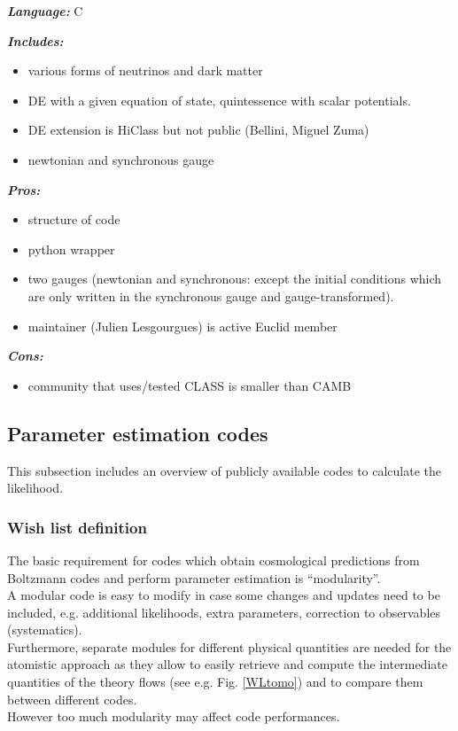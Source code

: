 {\it \bf  Language:} C

{\it \bf Includes:}
\begin{itemize}
 \item various forms of neutrinos and dark matter
 \item DE with a given equation of state, quintessence with scalar potentials.
 \item DE extension is HiClass but not public (Bellini, Miguel Zuma)
 \item newtonian and synchronous gauge
\end{itemize}

{\it \bf Pros: }
\begin{itemize}
 \item structure of code
 \item python wrapper
 \item two gauges (newtonian and synchronous: except the initial conditions which are only written in the synchronous gauge and gauge-transformed). 
 \item maintainer (Julien Lesgourgues) is active Euclid member
\end{itemize}

{\it \bf Cons: }
\begin{itemize}
 \item community that uses/tested CLASS is smaller than CAMB
\end{itemize}


\newpage
\subsection{Parameter estimation codes}
This subsection includes an overview of publicly available codes to calculate the likelihood.

\subsubsection{Wish list definition}

The basic requirement for codes which obtain cosmological predictions from Boltzmann codes and perform parameter estimation is ``modularity''.\\
A modular code is easy to modify in case some changes and updates need to be included, e.g. additional likelihoods, extra parameters, correction to observables (systematics).\\
Furthermore, separate modules for different physical quantities are needed for the atomistic approach as they allow to easily retrieve and compute the intermediate quantities of the theory
flows (see e.g. Fig. \ref{WLtomo}) and to compare them between different codes.\\
However too much modularity may affect code performances.\\

